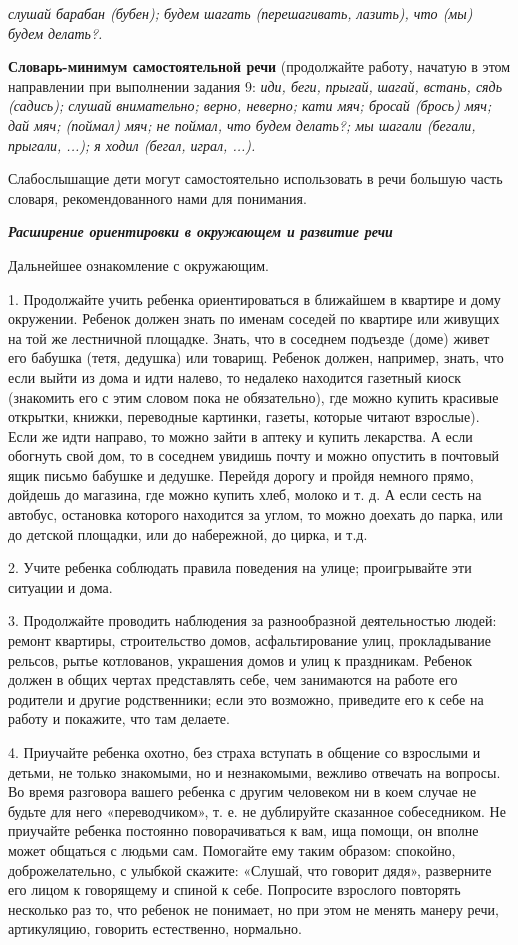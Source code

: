 \documentclass{book}
\renewcommand{\emph}[1]{\textit{#1}}
\begin{document}
\emph{слушай барабан (бубен); будем шагать (перешагивать, лазить), что
(мы) будем делать?.}

\textbf{Словарь-минимум самостоятельной речи} (продолжайте работу,
начатую в этом направлении при выполнении задания 9: \emph{иди, беги,}
\emph{прыгай,} \emph{шагай, встань, сядь (садись); слушай внимательно;
верно, неверно; кати мяч; бросай (брось) мяч; дай мяч; (поймал) мяч; не
поймал, что будем делать?; мы шагали (бегали, прыгали, ...); я ходил
(бегал, играл, ...).}

Слабослышащие дети могут самостоятельно использовать в речи большую
часть словаря, рекомендованного нами для понимания.

\emph{\textbf{Расширение ориентировки в окружающем и развитие речи}}

Дальнейшее ознакомление с окружающим.

1. Продолжайте учить ребенка ориентироваться в ближайшем в квартире и
дому окружении. Ребенок должен знать по именам соседей по квартире или
живущих на той же лестничной площадке. Знать, что в соседнем подъезде
(доме) живет его бабушка (тетя, дедушка) или товарищ. Ребенок должен,
например, знать, что если выйти из дома и идти налево, то недалеко
находится газетный киоск (знакомить его с этим словом пока не
обязательно), где можно купить красивые открытки, книжки, переводные
картинки, газеты, которые читают взрослые). Если же идти направо, то
можно зайти в аптеку и купить лекарства. А если обогнуть свой дом, то в
соседнем увидишь почту и можно опустить в почтовый ящик письмо бабушке и
дедушке. Перейдя дорогу и пройдя немного прямо, дойдешь до магазина, где
можно купить хлеб, молоко и т. д. А если сесть на автобус, остановка
которого находится за углом, то можно доехать до парка, или до детской
площадки, или до набережной, до цирка, и т.д.

2. Учите ребенка соблюдать правила поведения на улице; проигрывайте эти
ситуации и дома.

3. Продолжайте проводить наблюдения за разнообразной деятельностью
людей: ремонт квартиры, строительство домов, асфальтирование улиц,
прокладывание рельсов, рытье котлованов, украшения домов и улиц к
праздникам. Ребенок должен в общих чертах представлять себе, чем
занимаются на работе его родители и другие родственники; если это
возможно, приведите его к себе на работу и покажите, что там делаете.

4. Приучайте ребенка охотно, без страха вступать в общение со взрослыми
и детьми, не только знакомыми, но и незнакомыми, вежливо отвечать на
вопросы. Во время разговора вашего ребенка с другим человеком ни в коем
случае не будьте для него «переводчиком», т. е. не дублируйте сказанное
собеседником. Не приучайте ребенка постоянно поворачиваться к вам, ища
помощи, он вполне может общаться с людьми сам. Помогайте ему таким
образом: спокойно, доброжелательно, с улыбкой скажите: «Слушай, что
говорит дядя», разверните его лицом к говорящему и спиной к себе.
Попросите взрослого повторять несколько раз то, что ребенок не понимает,
но при этом не менять манеру речи, артикуляцию, говорить естественно,
нормально.
\end{document}
